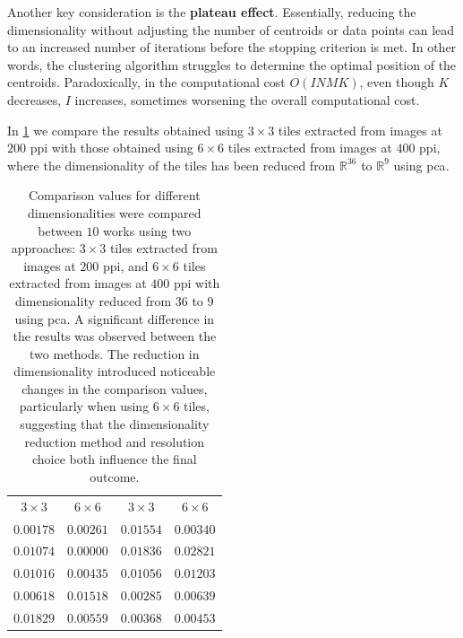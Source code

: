 \begin{toReview}
	\noindent Another key consideration is the \textbf{plateau effect}. Essentially, reducing the dimensionality without adjusting the number of centroids or data points can lead to an increased number of iterations before the stopping criterion is met. In other words, the clustering algorithm struggles to determine the optimal position of the centroids. Paradoxically, in the computational cost $O(INMK)$, even though $K$ decreases, $I$ increases, sometimes worsening the overall computational cost.

	\noindent In \cref{tab:distDimensions} we compare the results obtained using $3\times3$ tiles extracted from images at $200$ \gls{ppi} with those obtained using $6\times6$ tiles extracted from images at $400$ \gls{ppi}, where the dimensionality of the tiles has been reduced from $\mathbb{R}^{36}$ to $\mathbb{R}^9$ using \gls{pca}.

	\begin{table}[H]
		\centering
		\begin{tabular}{|c|c||c|c|}
			\hline
			\rowcolor{ambra}
			\multicolumn{4}{|c|}{size of tiles} \\
			\hline
			\rowcolor {lavender} $3\times3$ & $6\times6$ & $3\times3$ & $6\times6$ \\
			\hline
			$0.00178$ & $0.00261$ & $0.01554$ & $0.00340$ \\
			\hline
			$0.01074$ & $0.00000$ & $0.01836$ & $0.02821$ \\
			\hline
			$0.01016$ & $0.00435$ & $0.01056$ & $0.01203$ \\
			\hline
			$0.00618$ & $0.01518$ & $0.00285$ & $0.00639$ \\
			\hline
			$0.01829$ & $0.00559$ & $0.00368$ & $0.00453$ \\
			\hline
		\end{tabular}
		\caption[Comparison values for different dimension]{Comparison values for different dimensionalities were compared between $10$ works using two approaches: $3\times3$ tiles extracted from images at $200$ \gls{ppi}, and $6\times6$ tiles extracted from images at $400$ \gls{ppi} with dimensionality reduced from $36$ to $9$ using \gls{pca}. A significant difference in the results was observed between the two methods. The reduction in dimensionality introduced noticeable changes in the comparison values, particularly when using $6\times6$ tiles, suggesting that the dimensionality reduction method and resolution choice both influence the final outcome.}
		\label{tab:distDimensions}
	\end{table}


\end{toReview}
